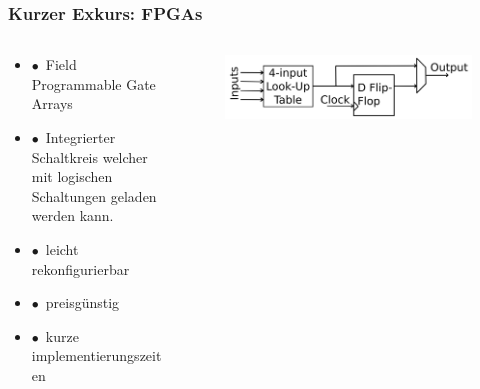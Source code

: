 \documentclass[aspectratio=1610, 12pt, xcolor=dvipsnames]{beamer}
\begin{document}
\begin{frame}\frametitle{Kurzer Exkurs: FPGAs}
  \begin{columns}
    \begin{column}[c]{0.48\textwidth}
      \begin{itemize}
        \item $\bullet$\, Field Programmable Gate Arrays
        \item $\bullet$\, Integrierter Schaltkreis welcher mit logischen Schaltungen geladen werden kann.
        \item $\bullet$\, leicht rekonfigurierbar
        \item $\bullet$\, preisgünstig
        \item $\bullet$\, kurze implementierungszeiten
      \end{itemize}
    \end{column}
    \begin{column}[c]{0.48\textwidth}
      \begin{figure}
        \centering
        \includegraphics[width=\textwidth]{plots/FPGA.png}
      \end{figure}
    \end{column}
  \end{columns}
\end{frame}
\end{document}
